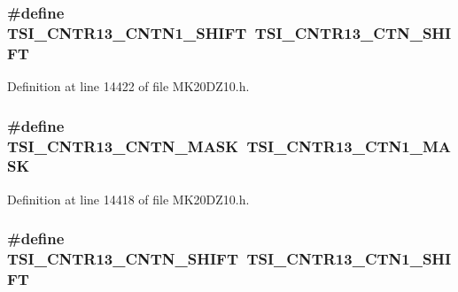 \subsubsection[{\texorpdfstring{T\+S\+I\+\_\+\+C\+N\+T\+R13\+\_\+\+C\+N\+T\+N1\+\_\+\+S\+H\+I\+FT}{TSI_CNTR13_CNTN1_SHIFT}}]{\setlength{\rightskip}{0pt plus 5cm}\#define T\+S\+I\+\_\+\+C\+N\+T\+R13\+\_\+\+C\+N\+T\+N1\+\_\+\+S\+H\+I\+FT~{\bf T\+S\+I\+\_\+\+C\+N\+T\+R13\+\_\+\+C\+T\+N\+\_\+\+S\+H\+I\+FT}}\hypertarget{group___backward___compatibility___symbols_gab607013034255dcfa6529c0e4e59683a}{}\label{group___backward___compatibility___symbols_gab607013034255dcfa6529c0e4e59683a}


Definition at line 14422 of file M\+K20\+D\+Z10.\+h.

\subsubsection[{\texorpdfstring{T\+S\+I\+\_\+\+C\+N\+T\+R13\+\_\+\+C\+N\+T\+N\+\_\+\+M\+A\+SK}{TSI_CNTR13_CNTN_MASK}}]{\setlength{\rightskip}{0pt plus 5cm}\#define T\+S\+I\+\_\+\+C\+N\+T\+R13\+\_\+\+C\+N\+T\+N\+\_\+\+M\+A\+SK~{\bf T\+S\+I\+\_\+\+C\+N\+T\+R13\+\_\+\+C\+T\+N1\+\_\+\+M\+A\+SK}}\hypertarget{group___backward___compatibility___symbols_ga225dcc41c24002a47e623a46d5d062b8}{}\label{group___backward___compatibility___symbols_ga225dcc41c24002a47e623a46d5d062b8}


Definition at line 14418 of file M\+K20\+D\+Z10.\+h.

\subsubsection[{\texorpdfstring{T\+S\+I\+\_\+\+C\+N\+T\+R13\+\_\+\+C\+N\+T\+N\+\_\+\+S\+H\+I\+FT}{TSI_CNTR13_CNTN_SHIFT}}]{\setlength{\rightskip}{0pt plus 5cm}\#define T\+S\+I\+\_\+\+C\+N\+T\+R13\+\_\+\+C\+N\+T\+N\+\_\+\+S\+H\+I\+FT~{\bf T\+S\+I\+\_\+\+C\+N\+T\+R13\+\_\+\+C\+T\+N1\+\_\+\+S\+H\+I\+FT}}\hypertarget{group___backward___compatibility___symbols_ga057c043bd52f646e26b4887c50618c2c}{}\label{group___backward___compatibility___symbols_ga057c043bd52f646e26b4887c50618c2c}


